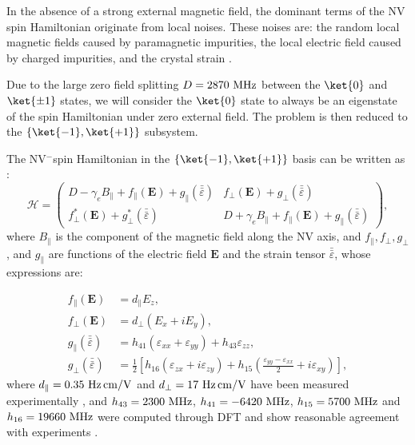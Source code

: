 \documentclass[a4paper, 11pt]{book}
\begin{document}
In the absence of a strong external magnetic field, the dominant terms of the NV spin Hamiltonian originate from local noises. These noises are: the random local magnetic fields caused by paramagnetic impurities, the local electric field caused by charged impurities, and the crystal strain \citep{doherty2012theory, udvarhelyi2018spin, mittiga2018imaging}. 

Due to the large zero field splitting $D=2870\ \rm MHz$ between the $\ket{0}$ and $\ket{\pm 1}$ states, we will consider the $\ket{0}$ state to always be an eigenstate of the spin Hamiltonian under zero external field. The problem is then reduced to the $\{ \ket{-1}, \ket{+1} \}$ subsystem.

The NV$^-$spin Hamiltonian in the $\{ \ket{-1}, \ket{+1} \}$ basis can be written as \citep{udvarhelyi2018spin}:
\begin{equation}
\mathcal{H}=\begin{pmatrix}
D-\gamma_e B_\parallel + f_\parallel(\mathbf{E}) + g_\parallel(\bar{\bar{\varepsilon}}) & f_\perp(\mathbf{E}) + g_\perp(\bar{\bar{\varepsilon}})\\
f^*_\perp(\mathbf{E}) + g^*_\perp(\bar{\bar{\varepsilon}})&D+\gamma_e B_\parallel + f_\parallel(\mathbf{E}) + g_\parallel(\bar{\bar{\varepsilon}})
\end{pmatrix},
\label{Hamiltonien pm1}
\end{equation}
where $B_\parallel$ is the component of the magnetic field along the NV axis, and $f_\parallel, f_\perp, g_\perp$, and $g_\parallel$ are functions of the electric field $\mathbf{E}$ and the strain tensor $\bar{\bar{\varepsilon}}$, whose expressions are:

\begin{align}
f_\parallel(\mathbf{E})&=d_\parallel E_z, \\
f_\perp(\mathbf{E})&=d_\perp ( E_x + i E_y), \\
g_\parallel(\bar{\bar{\varepsilon}})&= h_{41}(\varepsilon_{xx}+\varepsilon_{yy})+h_{43} \varepsilon_{zz}, \\
g_\perp(\bar{\bar{\varepsilon}}) &= \frac{1}{2} \left[ h_{16}(\varepsilon_{zx}+i \varepsilon_{zy}) + h_{15}\left(\frac{\varepsilon_{yy}-\varepsilon_{xx}}{2}+i\varepsilon_{xy}\right) \right],
\end{align}
where $d_\parallel=0.35 \ \rm{Hz\, cm/V}$ and $d_\perp=17\ \rm{Hz\, cm/V}$ have been measured experimentally \citep{van1990electric}, and $h_{43}=2300\ \rm{MHz}$, $h_{41}=-6420\ \rm{MHz}$, $h_{15}=5700\ \rm{MHz}$ and $h_{16}=19660\ \rm{MHz}$ were computed through DFT \citep{udvarhelyi2018spin} and show reasonable agreement with experiments \citep{barson2017nanomechanical}.
\end{document}
